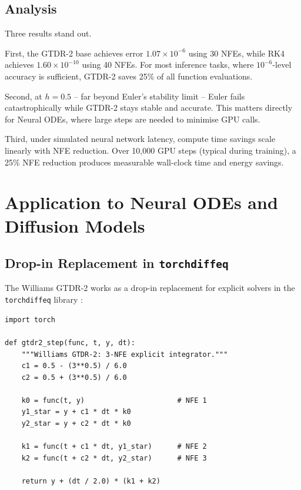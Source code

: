\documentclass[conference]{IEEEtran}
\begin{document}
\subsection{Analysis}

Three results stand out.

First, the GTDR-2 base achieves error $1.07 \times 10^{-6}$ using 30
NFEs, while RK4 achieves $1.60 \times 10^{-10}$ using 40 NFEs. For most
inference tasks, where $10^{-6}$-level accuracy is sufficient, GTDR-2
saves 25\% of all function evaluations.

Second, at $h = 0.5$ -- far beyond Euler's stability limit -- Euler
fails catastrophically while GTDR-2 stays stable and accurate. This
matters directly for Neural ODEs, where large steps are needed to
minimise GPU calls.

Third, under simulated neural network latency, compute time savings scale
linearly with NFE reduction. Over 10,000 GPU steps (typical during
training), a 25\% NFE reduction produces measurable wall-clock time and
energy savings.

\section{Application to Neural ODEs and Diffusion Models}
\label{sec:application}

\subsection{Drop-in Replacement in \texttt{torchdiffeq}}

The Williams GTDR-2 works as a drop-in replacement for explicit solvers
in the \texttt{torchdiffeq} library \cite{chen2018neuralode}:

\begin{lstlisting}[caption={Williams GTDR-2 as a torchdiffeq step function}]
import torch

def gtdr2_step(func, t, y, dt):
    """Williams GTDR-2: 3-NFE explicit integrator."""
    c1 = 0.5 - (3**0.5) / 6.0
    c2 = 0.5 + (3**0.5) / 6.0

    k0 = func(t, y)                      # NFE 1
    y1_star = y + c1 * dt * k0
    y2_star = y + c2 * dt * k0

    k1 = func(t + c1 * dt, y1_star)      # NFE 2
    k2 = func(t + c2 * dt, y2_star)      # NFE 3

    return y + (dt / 2.0) * (k1 + k2)
\end{lstlisting}
\end{document}
